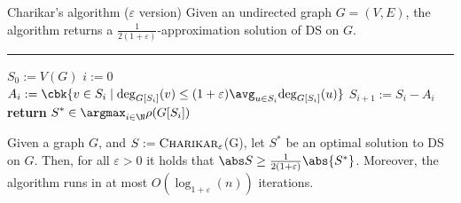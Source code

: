 \documentclass[a4paper, 12pt]{report}
\begin{document}
    \begin{framedalgo}{Charikar's algorithm ($\varepsilon$ version)}
        Given an undirected graph $G = (V, E)$, the algorithm returns a $\tfrac{1}{2(1 + \varepsilon)}$-approximation solution of DS on $G$. \\
        \hrule

        \quad
        \begin{algorithmic}[1]
                \State $S_0 := V(G)$
                \State $i := 0$
                    \State $\displaystyle A_i := \cbk{v \in S_i \mid \deg_{G[S_i]}(v) \le (1 + \varepsilon)\avg_{u \in S_i}{\deg_{G[S_i]}(u)}}$
                    \State $S_{i + 1} := S_i - A_i$
                \EndWhile
                \State \textbf{return} $\displaystyle S^* \in \argmax_{i \in \N}{\rho(G[S_i])}$
            \EndFunction
        \end{algorithmic}
    \end{framedalgo}

    \begin{framedthm}{}
        Given a graph $G$, and $S := \textsc{Charikar}_\varepsilon$(G), let $S^*$ be an optimal solution to DS on $G$. Then, for all $\varepsilon > 0$ it holds that $\abs S \ge \tfrac{1}{2(1 + \varepsilon)} \abs{S^*}$. Moreover, the algorithm runs in at most $O(\log_{1 + \varepsilon}(n))$ iterations.
    \end{framedthm}
\end{document}
